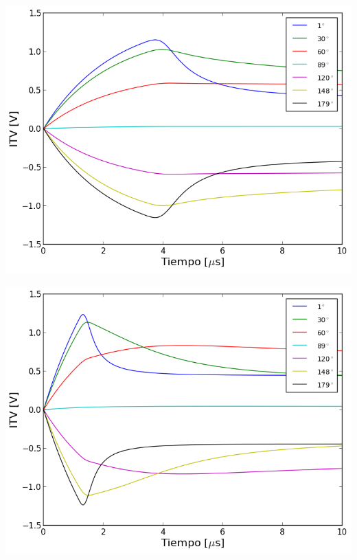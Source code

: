 \documentclass[a0,portrait]{a0poster}
\begin{document}
\begin{multicols}{2}
	\begin{multicols}{2}
		\begin{center}\vspace{1cm}
			\includegraphics[width=1\linewidth]{itv-time-lin-25-64-40KVm}
		\end{center}\vspace{1cm}
	\columnbreak
		\begin{center}\vspace{1cm}
			\includegraphics[width=1\linewidth]{itv-time-lin-25-64-80KVm}
		\end{center}\vspace{1cm}
	\end{multicols}


\end{multicols}
\end{document}
